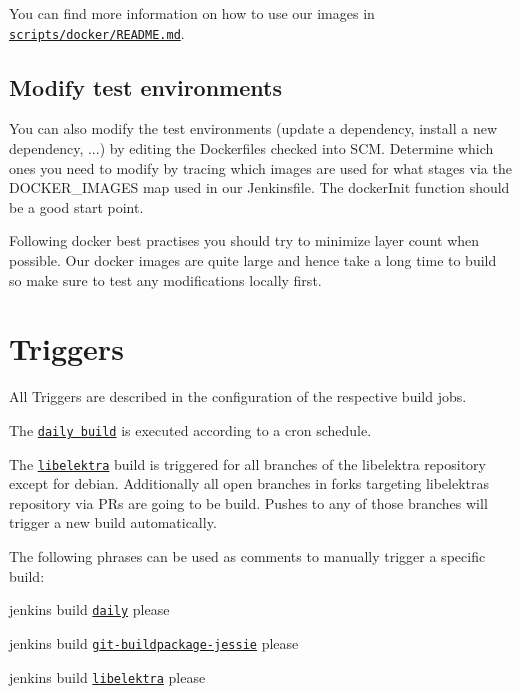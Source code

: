 You can find more information on how to use our images in \href{https://master.libelektra.org/scripts/docker/README.md#testing-elektra-via-docker-images}{\tt scripts/docker/\+R\+E\+A\+D\+M\+E.\+md}.

\subsection*{Modify test environments}

You can also modify the test environments (update a dependency, install a new dependency, ...) by editing the Dockerfiles checked into S\+CM. Determine which ones you need to modify by tracing which images are used for what stages via the {\ttfamily D\+O\+C\+K\+E\+R\+\_\+\+I\+M\+A\+G\+ES} map used in our Jenkinsfile. The {\ttfamily docker\+Init} function should be a good start point.

Following docker best practises you should try to minimize layer count when possible. Our docker images are quite large and hence take a long time to build so make sure to test any modifications locally first.

\section*{Triggers}

All Triggers are described in the configuration of the respective build jobs.

The \href{https://build.libelektra.org/jenkins/job/libelektra-daily/}{\tt daily build} is executed according to a cron schedule.

The \href{https://build.libelektra.org/jenkins/job/libelektra/}{\tt libelektra} build is triggered for all branches of the libelektra repository except for {\ttfamily debian}. Additionally all open branches in forks targeting libelektra\textquotesingle{}s repository via P\+Rs are going to be build. Pushes to any of those branches will trigger a new build automatically.

The following phrases can be used as comments to manually trigger a specific build\+:


\begin{DoxyItemize}
\item jenkins build \href{https://build.libelektra.org/jenkins/job/libelektra-daily/}{\tt daily} please
\item jenkins build \href{https://build.libelektra.org/job/elektra-git-buildpackage-jessie/}{\tt git-\/buildpackage-\/jessie} please
\item jenkins build \href{https://build.libelektra.org/jenkins/job/libelektra/}{\tt libelektra} please
\end{DoxyItemize}


